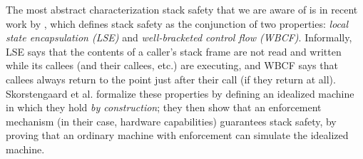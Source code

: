 \documentclass[acmsmall,review,anonymous]{acmart}\settopmatter{printfolios=true,printccs=false,printacmref=false}
\begin{document}
The most abstract characterization stack safety that we are aware of is in
recent work by \citet{Skorstengaard+19}, which defines stack safety as the conjunction of two
properties:
{\em local state encapsulation (LSE)} and {\em well-bracketed control flow (WBCF)}.
Informally, LSE says that the contents of
a caller's stack frame are not read and written while its callees (and their callees, etc.) are
executing, and WBCF says that callees always
return to the point just after their call (if they return at all).
Skorstengaard et al.{} formalize these properties by defining an idealized
machine in which they hold {\em by construction};
they then show that an enforcement
mechanism (in their case, hardware capabilities) guarantees stack safety, by
proving that an ordinary machine with enforcement can simulate the idealized machine.
\end{document}

